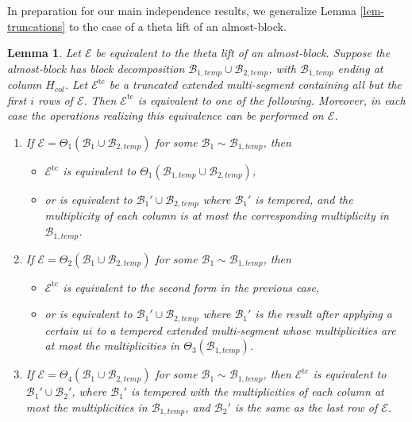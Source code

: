 \documentclass[11pt,letterpaper]{amsart}
\newcommand{\BB}{\mathcal{B}}
\newcommand{\EE}{\mathcal{E}}
\newcommand{\tc}{\operatorname{tc}}
\newtheorem{lemma}[thm]{Lemma}
\numberwithin{equation}{section}
\begin{document}
In preparation for our main independence results, we generalize Lemma \ref{lem-truncations} to the case of a theta lift of an almost-block.

\begin{lemma}
\label{lem-truncations-theta-lifts}
    Let $\EE$ be equivalent to the theta lift of an almost-block. Suppose the almost-block has block decomposition $\BB_{1, temp} \cup \BB_{2, temp}$, with $\BB_{1, temp}$ ending at column $H_{col}$. Let $\EE^{\tc}$ be a truncated extended multi-segment containing all but the first $i$ rows of $\EE$. Then $\EE^{\tc}$ is equivalent to one of the following. Moreover, in each case the operations realizing this equivalence can be performed on $\EE$.
    \begin{enumerate}
        \item If $\EE = \Theta_1(\BB_1 \cup \BB_{2, temp})$ for some $\BB_1 \sim \BB_{1, temp}$, then
        \begin{itemize}
            \item $\EE^{\tc}$ is equivalent to $\Theta_1(\BB_{1, temp} \cup \BB_{2, temp})$,
            \item or is equivalent to $\BB_1' \cup \BB_{2, temp}$ where $\BB_1'$ is tempered, and the multiplicity of each column is at most the corresponding multiplicity in $\BB_{1, temp}$.
        \end{itemize}
        \item If $\EE = \Theta_2(\BB_1 \cup \BB_{2, temp})$ for some $\BB_1 \sim \BB_{1, temp}$, then
        \begin{itemize}
            \item $\EE^{\tc}$ is equivalent to the second form in the previous case,
            \item or is equivalent to $\BB_1' \cup \BB_{2, temp}$ where $\BB_1'$ is the result after applying a certain $ui$ to a tempered extended multi-segment whose multiplicities are at most the multiplicities in $\Theta_3(\BB_{1, temp})$.
        \end{itemize}
        \item If $\EE = \Theta_4(\BB_1 \cup \BB_{2, temp})$ for some $\BB_1 \sim \BB_{1, temp}$, then $\EE^{\tc}$ is equivalent to $\BB_1' \cup \BB_2'$, where $\BB_1'$ is tempered with the multiplicities of each column at most the multiplicities in $\BB_{1, temp}$, and $\BB_2'$ is the same as the last row of $\EE$.
    \end{enumerate}
\end{lemma}
\end{document}
